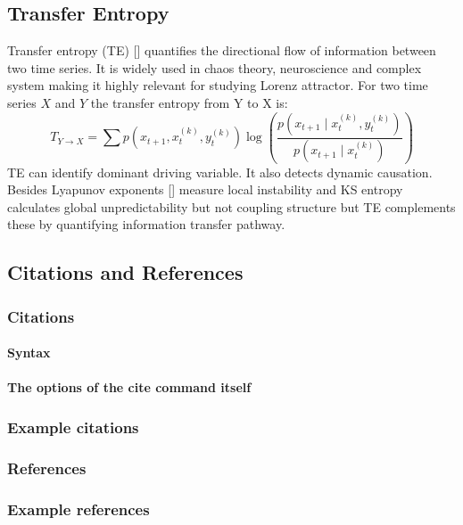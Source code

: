 \documentclass[%
 reprint,
 amsmath,amssymb,
 aps,
 floatfix,
]{revtex4-2}
\begin{document}
\subsection{Transfer Entropy}
Transfer entropy (TE) [] quantifies the directional flow of information between two time series. It is widely used in chaos theory, neuroscience and complex system making it highly relevant for studying Lorenz attractor. For two time series $X$ and $Y$ the transfer entropy from Y to X is:
\begin{equation}
T_{Y\to X} = \sum p(x_{t+1}, x_{t}^{(k)}, y_{t}^{(k)}) \log\left( \frac{p(x_{t+1} \mid x_{t}^{(k)}, y_{t}^{(k)})}{p(x_{t+1} \mid x_{t}^{(k)})} \right)
\end{equation}
TE can identify dominant driving variable. It also detects dynamic causation. Besides Lyapunov exponents [] measure local instability and KS entropy calculates global unpredictability but not coupling structure but TE complements these by quantifying information transfer pathway.
\subsection{\label{sec:citeref}Citations and References}


\subsubsection{Citations}


\paragraph{Syntax}


\paragraph{The options of the cite command itself}


\subsubsection{Example citations}


\subsubsection{References}


\subsubsection{Example references}
\end{document}
